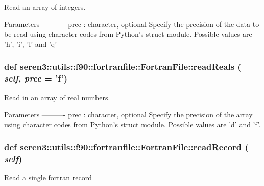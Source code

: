 \label{classseren3_1_1utils_1_1f90_1_1fortranfile_1_1FortranFile_a3280686a5ad1ca9bda485433d63a547a}
\begin{DoxyVerb}Read an array of integers.

Parameters
----------
prec : character, optional
    Specify the precision of the data to be read using 
    character codes from Python's struct module.  Possible
    values are 'h', 'i', 'l' and 'q'
    
\end{DoxyVerb}
 \hypertarget{classseren3_1_1utils_1_1f90_1_1fortranfile_1_1FortranFile_a4a59b61f7e55fe4bf4c4912acf0e6123}{
\subsubsection[{readReals}]{\setlength{\rightskip}{0pt plus 5cm}def seren3::utils::f90::fortranfile::FortranFile::readReals ( {\em self}, \/   {\em prec} = {\ttfamily 'f'})}}
\label{classseren3_1_1utils_1_1f90_1_1fortranfile_1_1FortranFile_a4a59b61f7e55fe4bf4c4912acf0e6123}
\begin{DoxyVerb}Read in an array of real numbers.

Parameters
----------
prec : character, optional
    Specify the precision of the array using character codes from
    Python's struct module.  Possible values are 'd' and 'f'.
    
\end{DoxyVerb}
 \hypertarget{classseren3_1_1utils_1_1f90_1_1fortranfile_1_1FortranFile_a7f95a2fb0c7fbc782fde369100e34ff8}{
\subsubsection[{readRecord}]{\setlength{\rightskip}{0pt plus 5cm}def seren3::utils::f90::fortranfile::FortranFile::readRecord ( {\em self})}}
\label{classseren3_1_1utils_1_1f90_1_1fortranfile_1_1FortranFile_a7f95a2fb0c7fbc782fde369100e34ff8}
\begin{DoxyVerb}Read a single fortran record\end{DoxyVerb}
